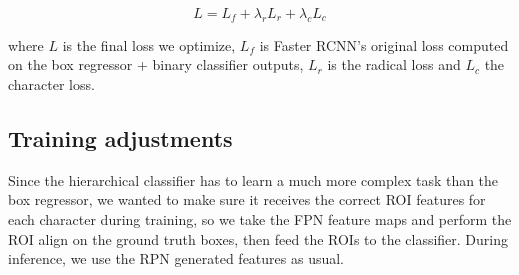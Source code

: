 \[
    L = L_f + \lambda_r L_r + \lambda_c L_c
\]

where $L$ is the final loss we optimize, $L_f$ is Faster RCNN's original loss computed on the box regressor + binary classifier outputs, $L_r$ is the radical loss and $L_c$ the character loss.

\subsection{Training adjustments}

Since the hierarchical classifier has to learn a much more complex task than the box regressor, we wanted to make sure it receives the correct ROI features for each character during training, so we take the FPN feature maps and perform the ROI align on the ground truth boxes, then feed the ROIs to the classifier. During inference, we use the RPN generated features as usual.
